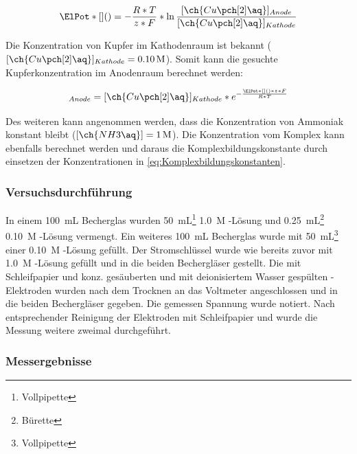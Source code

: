 \documentclass{article}
\begin{document}
        \begin{equation}
          \ElPot*[](){} = - \frac{R * T}{z * F} * \ln \frac{[\ch{Cu\pch[2]\aq}]_{Anode}}{[\ch{Cu\pch[2]\aq}]_{Kathode}}
        \end{equation}
        
        Die Konzentration von Kupfer im Kathodenraum ist bekannt ($[\ch{Cu\pch[2]\aq}]_{Kathode} = \SI[mode=text]{0.10}{M}$). Somit kann die gesuchte Kupferkonzentration im Anodenraum berechnet werden:
        
        \begin{equation}
          [\ch{Cu\pch[2]\aq}]_{Anode} = [\ch{Cu\pch[2]\aq}]_{Kathode} * e^{- \frac{\ElPot*[](){} * z * F}{R * T}}
        \end{equation}
        
        Des weiteren kann angenommen werden, dass die Konzentration von Ammoniak konstant bleibt ($[\ch{NH3\aq}] = \SI[mode=text]{1}{M}$). Die Konzentration vom Komplex kann ebenfalls berechnet werden und daraus die Komplexbildungskonstante durch einsetzen der Konzentrationen in \eqref{eq:Komplexbildungskonstanten}. 
        
        \subsubsection{Versuchsdurchführung} \label{sec.VersuchsdurchfuhrungKomplexbildung}
          
          In einem \SI[mode=text]{100}{\milli\liter} Becherglas wurden \SI[mode=text]{50}{\milli\liter}\footnote{Vollpipette} \SI[mode=text]{1.0}{M} -Lösung und \SI[mode=text]{0.25}{\milli\liter}\footnote{Bürette} \SI[mode=text]{0.10}{M} -Lösung vermengt. Ein weiteres \SI[mode=text]{100}{\milli\liter} Becherglas wurde mit \SI[mode=text]{50}{\milli\liter}\footnote{Vollpipette} einer \SI[mode=text]{0.10}{M} -Lösung gefüllt. Der Stromschlüssel wurde wie bereits zuvor mit \SI[mode=text]{1.0}{M} -Lösung gefüllt und in die beiden Bechergläser gestellt. Die mit Schleifpapier und konz.  gesäuberten und mit deionisiertem Wasser gespülten -Elektroden wurden nach dem Trocknen an das Voltmeter angeschlossen und in die beiden Bechergläser gegeben. Die gemessen Spannung wurde notiert. 
          Nach entsprechender Reinigung der Elektroden mit Schleifpapier und  wurde die Messung weitere zweimal durchgeführt. 
          
        \subsubsection{Messergebnisse} \label{sec:MessergebnisseKomplexbildung}
        
\end{document}
